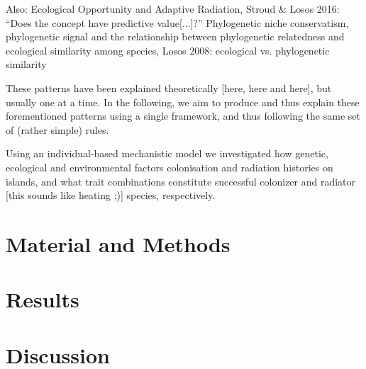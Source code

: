 \documentclass[a4paper]{scrartcl}
\begin{document}
Also: Ecological Opportunity and Adaptive Radiation, Stroud & Losos 2016: ``Does the concept have predictive value[...]?'' \cite{stroud2016ecological}
Phylogenetic niche conservatism, phylogenetic signal and the relationship between phylogenetic relatedness and ecological similarity among species, Losos 2008: ecological vs. phylogenetic similarity \cite{losos2008phylogenetic}

These patterns have been explained theoretically [here, here and here], but usually one at a time.
In the following, we aim to produce and thus explain these forementioned patterns using a single framework, and thus following the same set of (rather simple) rules.

Using an individual-based mechanistic model we investigated how genetic, ecological and environmental factors colonisation and radiation histories on islands,
and what trait combinations constitute successful colonizer and radiator [this sounds like heating ;)] species, respectively.
\section{Material and Methods}

\section{Results}

\section{Discussion}


\printbibliography
\end{document}
